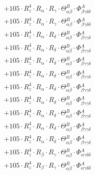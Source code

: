 \documentclass{article}
\begin{document}
\begin{subequations}
\begin{gather}
\begin{array}{c}
 \\[0.2em] 		 + 105 \cdot R_{z}^{4} \cdot R_{\alpha{}} \cdot R_{\gamma{}} \cdot \Theta{}^{B}_{\alpha{}\beta{}} \cdot \Phi{}^{A}_{\beta{}\gamma{}\delta{}\delta{}} 
 \\[0.2em] 		 + 105 \cdot R_{z}^{4} \cdot R_{\alpha{}} \cdot R_{\gamma{}} \cdot \Theta{}^{B}_{\alpha{}\beta{}} \cdot \Phi{}^{A}_{\beta{}\gamma{}\delta{}\delta{}} 
 \\[0.2em] 		 + 105 \cdot R_{z}^{4} \cdot R_{\alpha{}} \cdot R_{\delta{}} \cdot \Theta{}^{B}_{\alpha{}\beta{}} \cdot \Phi{}^{A}_{\beta{}\gamma{}\gamma{}\delta{}} 
 \\[0.2em] 		 + 105 \cdot R_{z}^{4} \cdot R_{\alpha{}} \cdot R_{\delta{}} \cdot \Theta{}^{B}_{\alpha{}\beta{}} \cdot \Phi{}^{A}_{\beta{}\gamma{}\gamma{}\delta{}} 
 \\[0.2em] 		 + 105 \cdot R_{z}^{4} \cdot R_{\alpha{}} \cdot R_{\delta{}} \cdot \Theta{}^{B}_{\alpha{}\beta{}} \cdot \Phi{}^{A}_{\beta{}\gamma{}\gamma{}\delta{}} 
 \\[0.2em] 		 + 105 \cdot R_{z}^{4} \cdot R_{\alpha{}} \cdot R_{\delta{}} \cdot \Theta{}^{B}_{\alpha{}\beta{}} \cdot \Phi{}^{A}_{\beta{}\gamma{}\gamma{}\delta{}} 
 \\[0.2em] 		 + 105 \cdot R_{z}^{4} \cdot R_{\alpha{}} \cdot R_{\delta{}} \cdot \Theta{}^{B}_{\alpha{}\beta{}} \cdot \Phi{}^{A}_{\beta{}\gamma{}\gamma{}\delta{}} 
 \\[0.2em] 		 + 105 \cdot R_{z}^{4} \cdot R_{\alpha{}} \cdot R_{\delta{}} \cdot \Theta{}^{B}_{\alpha{}\beta{}} \cdot \Phi{}^{A}_{\beta{}\gamma{}\gamma{}\delta{}} 
 \\[0.2em] 		 + 105 \cdot R_{z}^{4} \cdot R_{\alpha{}} \cdot R_{\delta{}} \cdot \Theta{}^{B}_{\alpha{}\beta{}} \cdot \Phi{}^{A}_{\beta{}\gamma{}\gamma{}\delta{}} 
 \\[0.2em] 		 + 105 \cdot R_{z}^{4} \cdot R_{\alpha{}} \cdot R_{\delta{}} \cdot \Theta{}^{B}_{\alpha{}\beta{}} \cdot \Phi{}^{A}_{\beta{}\gamma{}\gamma{}\delta{}} 
 \\[0.2em] 		 + 105 \cdot R_{z}^{4} \cdot R_{\alpha{}} \cdot R_{\delta{}} \cdot \Theta{}^{B}_{\alpha{}\beta{}} \cdot \Phi{}^{A}_{\beta{}\gamma{}\gamma{}\delta{}} 
 \\[0.2em] 		 + 105 \cdot R_{z}^{4} \cdot R_{\beta{}} \cdot R_{\gamma{}} \cdot \Theta{}^{B}_{\alpha{}\beta{}} \cdot \Phi{}^{A}_{\alpha{}\gamma{}\delta{}\delta{}} 
 \\[0.2em] 		 + 105 \cdot R_{z}^{4} \cdot R_{\beta{}} \cdot R_{\gamma{}} \cdot \Theta{}^{B}_{\alpha{}\beta{}} \cdot \Phi{}^{A}_{\alpha{}\gamma{}\delta{}\delta{}} 

\end{array}
\end{gather}
\end{subequations}
\end{document}
